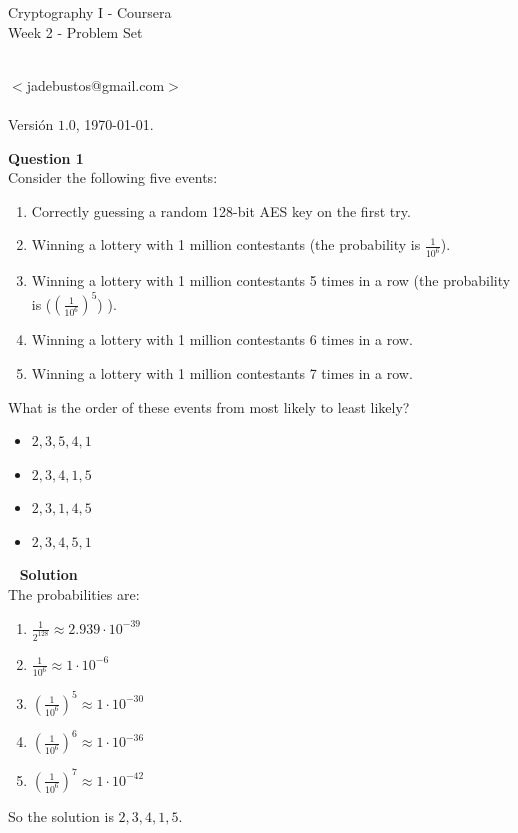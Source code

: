\documentclass[a4paper,12pt]{article}
\author{Jos\'e Angel de Bustos P\'erez}
\begin{document}
\thispagestyle{empty}

\begin{center}
\Huge{Cryptography I - Coursera} \\[.75cm]
\large{Week 2 - Problem Set}
\end{center}

\large 
\begin{flushright}
\yo \\
$<$jadebustos@gmail.com$>$\\ \ \\ 
Versi\'on $1.0$, \today .\\
\textbf{\LaTeXe}
\end{flushright}

\normalsize

\textbf{Question 1} \\

Consider the following five events:
%
\begin{enumerate}
\item Correctly guessing a random 128-bit AES key on the first try.
\item Winning a lottery with 1 million contestants (the probability is $\frac{1}{10^{6}}$).
\item Winning a lottery with 1 million contestants 5 times in a row (the probability is ($\left(\frac{1}{10^{6}}\right)^{5}$) ).
\item Winning a lottery with 1 million contestants 6 times in a row.
\item Winning a lottery with 1 million contestants 7 times in a row.
\end{enumerate}
%
What is the order of these events from most likely to least likely?
%
\begin{itemize}
\item $2, 3, 5, 4, 1$
\item \textbf{$2, 3, 4, 1, 5$}
\item $2, 3, 1, 4, 5$
\item $2, 3, 4, 5, 1$
\end{itemize}
%
\ \newpage
%
\textbf{Solution}\\

The probabilities are:
%
\begin{enumerate}
\item $\frac{1}{2^{128}} \approx 2.939 \cdot 10^{-39}$
\item $\frac{1}{10^{6}} \approx 1\cdot 10^{-6}$
\item $(\frac{1}{10^{6}})^{5} \approx 1 \cdot 10^{-30}$
\item $(\frac{1}{10^{6}})^{6} \approx 1 \cdot 10^{-36}$
\item $(\frac{1}{10^{6}})^{7} \approx 1 \cdot 10^{-42}$
\end{enumerate}
%
So the solution is $2,3,4,1,5$.\\
\end{document}
